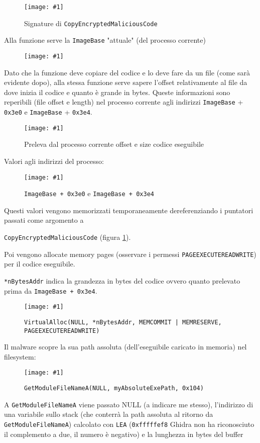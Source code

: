 \documentclass[
    a4paper, %
    11pt %
]{article}
\newcommand{\pic}[4]{\begin{figure}[H]
            \centering
            \texttt{[image: \#1]}
            \caption{#2}
            \label{fig:#1}
            \end{figure}}
\begin{document}
            \pic{cemc_signature}{Signature di \texttt{CopyEncryptedMaliciousCode}}{19cm}{2cm}

            Alla funzione serve la \texttt{ImageBase} "attuale" (del processo corrente)
            \pic{cemc_getimagebase}{}{8cm}{3cm}

            Dato che la funzione deve copiare del codice e lo deve fare da un file (come sarà evidente dopo),
            alla stessa funzione serve sapere l'offset relativamente al file da dove inizia il codice e quanto è
            grande in bytes. Queste informazioni sono reperibili (file offset e length) 
            nel processo corrente agli indirizzi \texttt{ImageBase} + \texttt{0x3e0} e \texttt{ImageBase} + \texttt{0x3e4}.

            \pic{cemc_offs}{Preleva dal processo corrente offset e size codice eseguibile}{17cm}{7cm}

            Valori agli indirizzi del processo:

            \pic{cemc_offs_data}{\texttt{ImageBase + 0x3e0} e \texttt{ImageBase + 0x3e4}}{12cm}{3cm}

            Questi valori vengono memorizzati temporaneamente dereferenziando i puntatori passati come argomento a
            
            \texttt{CopyEncryptedMaliciousCode} (figura \ref{fig:cemc_signature}).

            Poi vengono allocate memory pages (osservare i permessi 
            \texttt{PAGE\textunderscore EXECUTE\textunderscore READWRITE}) 
            per il codice eseguibile. 
            
            \texttt{*nBytesAddr} indica la grandezza in bytes del codice ovvero quanto prelevato prima
            da \texttt{ImageBase + 0x3e4}.
            
            \pic{cemc_alloc}{\texttt{VirtualAlloc(NULL, *nBytesAddr, 
            MEM\textunderscore COMMIT | MEM\textunderscore RESERVE,
            PAGE\textunderscore EXECUTE\textunderscore READWRITE)}}{18cm}{8cm}

            \pagebreak

            Il malware scopre la sua path assoluta (dell'eseguibile caricato in memoria) nel filesystem:
            \pic{cemc_path}{\texttt{GetModuleFileNameA(NULL, myAbsoluteExePath, 0x104)}}{15cm}{5cm}
            A \texttt{GetModuleFileNameA} viene passato NULL (a indicare me stesso), l'indirizzo di una variabile sullo
            stack (che conterrà la path assoluta al ritorno da \texttt{GetModuleFileNameA}) calcolato con \texttt{LEA}
            (\texttt{0xfffffef8} Ghidra non ha riconosciuto il complemento a due, il numero è negativo) e la lunghezza
            in bytes del buffer
\end{document}
